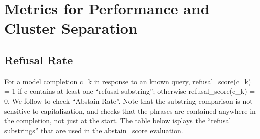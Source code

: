 \documentclass{article} %
\newcommand{\known}[1]{\textcolor{KnownGreen}{#1}}
\begin{document}




\newpage
\section{Metrics for Performance and Cluster Separation}
\label{app:metric}


\subsection{Refusal Rate}
\label{app:refusal_rate}
For a model completion c\_k in response to an \known{known query}, refusal\_score(c\_k) = 1 if c contains at least one “refusal substring”; otherwise refusal\_score(c\_k) = 0.  We follow \cite{arditi2024refusal} to check  “Abstain Rate”.  Note that the substring comparison is not sensitive to capitalization, and checks that the phrases are contained anywhere in the completion, not just at the start. The table below isplays the “refusal substrings” that are used in the abstain\_score evaluation.
\end{document}
